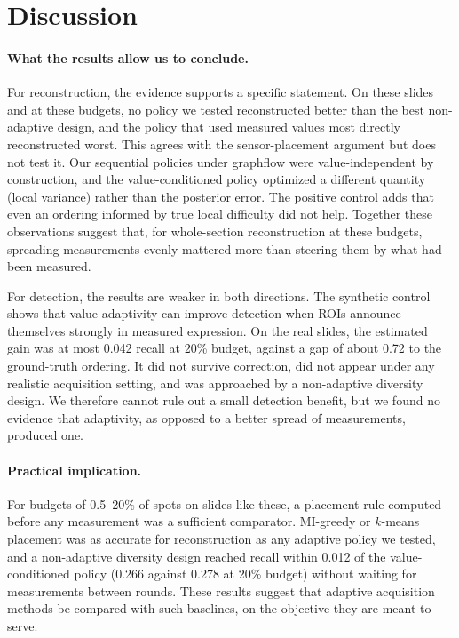 \documentclass{article}
\begin{document}
\section{Discussion}

\paragraph{What the results allow us to conclude.}
For reconstruction, the evidence supports a specific statement. On these slides and at these budgets, no
policy we tested reconstructed better than the best non-adaptive design, and the policy that used measured
values most directly reconstructed worst. This agrees with the sensor-placement argument but does not test it.
Our sequential policies under graphflow were value-independent by construction, and the value-conditioned
policy optimized a different quantity (local variance) rather than the posterior error. The positive control
adds that even an ordering informed by true local difficulty did not help. Together these observations suggest
that, for whole-section reconstruction at these budgets, spreading measurements evenly mattered more than
steering them by what had been measured.

For detection, the results are weaker in both directions. The synthetic control shows that value-adaptivity can
improve detection when ROIs announce themselves strongly in measured expression. On the real slides, the
estimated gain was at most 0.042 recall at 20\% budget, against a gap of about 0.72 to the ground-truth
ordering. It did not survive correction, did not appear under any realistic acquisition setting, and was
approached by a non-adaptive diversity design. We therefore cannot rule out a small detection benefit, but we
found no evidence that adaptivity, as opposed to a better spread of measurements, produced one.

\paragraph{Practical implication.}
For budgets of 0.5--20\% of spots on slides like these, a placement rule computed before any measurement was a
sufficient comparator. MI-greedy or $k$-means placement was as accurate for reconstruction as any adaptive
policy we tested, and a non-adaptive diversity design reached recall within 0.012 of the value-conditioned policy
(0.266 against 0.278 at 20\% budget) without waiting for measurements between rounds. These results suggest
that adaptive acquisition methods be compared with such baselines, on the objective they are meant to serve.
\end{document}

